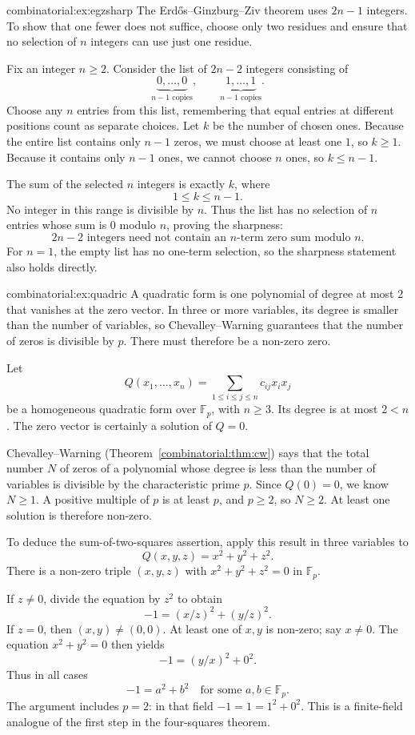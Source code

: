 \begin{solution}{combinatorial:ex:egzsharp}
\idea The Erd\H os--Ginzburg--Ziv theorem uses $2n-1$ integers. To show that one fewer does not suffice, choose only two residues and ensure that no selection of $n$ integers can use just one residue.

\writeup Fix an integer $n\ge2$. Consider the list of $2n-2$ integers consisting of
\[
\underbrace{0,\ldots,0}_{n-1\text{ copies}},
\qquad
\underbrace{1,\ldots,1}_{n-1\text{ copies}}.
\]
Choose any $n$ entries from this list, remembering that equal entries at different positions count as separate choices. Let $k$ be the number of chosen ones. Because the entire list contains only $n-1$ zeros, we must choose at least one $1$, so $k\ge1$. Because it contains only $n-1$ ones, we cannot choose $n$ ones, so $k\le n-1$.

The sum of the selected $n$ integers is exactly $k$, where
\[
1\le k\le n-1.
\]
No integer in this range is divisible by $n$. Thus the list has no selection of $n$ entries whose sum is $0$ modulo $n$, proving the sharpness:
\[
\boxed{2n-2\text{ integers need not contain an }n\text{-term zero sum modulo }n}.
\]
For $n=1$, the empty list has no one-term selection, so the sharpness
statement also holds directly.
\end{solution}

\begin{solution}{combinatorial:ex:quadric}
\idea A quadratic form is one polynomial of degree at most $2$ that vanishes at the zero vector. In three or more variables, its degree is smaller than the number of variables, so Chevalley--Warning guarantees that the number of zeros is divisible by $p$. There must therefore be a non-zero zero.

\writeup Let
\[
Q(x_1,\ldots,x_n)=\sum_{1\le i\le j\le n}c_{ij}x_ix_j
\]
be a homogeneous quadratic form over $\mathbb F_p$, with $n\ge3$. Its degree is at most $2<n$. The zero vector is certainly a solution of $Q=0$.

Chevalley--Warning (Theorem~\ref{combinatorial:thm:cw}) says that the total number $N$ of zeros of a polynomial whose degree is less than the number of variables is divisible by the characteristic prime $p$. Since $Q(0)=0$, we know $N\ge1$. A positive multiple of $p$ is at least $p$, and $p\ge2$, so $N\ge2$. At least one solution is therefore non-zero.

To deduce the sum-of-two-squares assertion, apply this result in three variables to
\[
Q(x,y,z)=x^2+y^2+z^2.
\]
There is a non-zero triple $(x,y,z)$ with $x^2+y^2+z^2=0$ in $\mathbb F_p$.

If $z\ne0$, divide the equation by $z^2$ to obtain
\[
-1=(x/z)^2+(y/z)^2.
\]
If $z=0$, then $(x,y)\ne(0,0)$. At least one of $x,y$ is non-zero; say $x\ne0$. The equation $x^2+y^2=0$ then yields
\[
-1=(y/x)^2+0^2.
\]
Thus in all cases
\[
\boxed{-1=a^2+b^2\quad\text{for some }a,b\in\mathbb F_p}.
\]
The argument includes $p=2$: in that field $-1=1=1^2+0^2$. This is a finite-field analogue of the first step in the four-squares theorem.
\end{solution}

